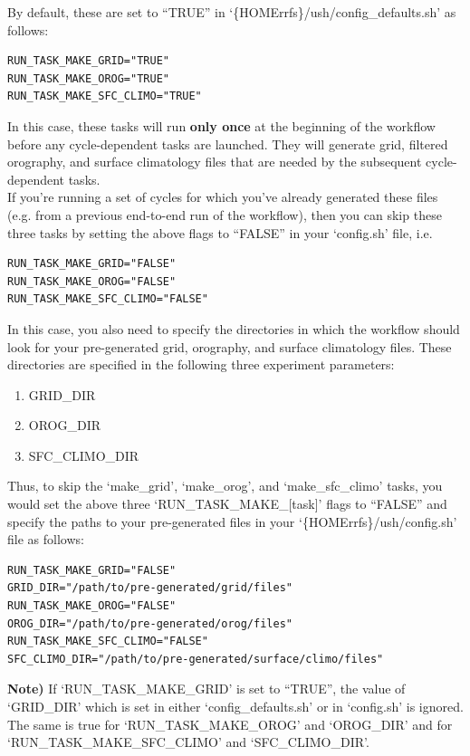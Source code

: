 \documentclass[11pt,fleqn]{report}              %
\begin{document}
By default, these are set to ``TRUE'' in `\{HOMErrfs\}/ush/config\_defaults.sh' as follows:
\lstset{language=bash}   
\begin{lstlisting}[frame=trBL]
RUN_TASK_MAKE_GRID="TRUE"
RUN_TASK_MAKE_OROG="TRUE"
RUN_TASK_MAKE_SFC_CLIMO="TRUE"
\end{lstlisting}

In this case, these tasks will run {\bf only once} at the beginning of the workflow before any cycle-dependent tasks are launched. They will generate grid, filtered orography, and surface climatology files that are needed by the subsequent cycle-dependent tasks.\\

If you’re running a set of cycles for which you’ve already generated these files (e.g. from a previous end-to-end run of the workflow), then you can skip these three tasks by setting the above flags to ``FALSE'' in your `config.sh' file, i.e.
\lstset{language=bash}   
\begin{lstlisting}[frame=trBL]
RUN_TASK_MAKE_GRID="FALSE"
RUN_TASK_MAKE_OROG="FALSE"
RUN_TASK_MAKE_SFC_CLIMO="FALSE"
\end{lstlisting}

In this case, you also need to specify the directories in which the workflow should look for your pre-generated grid, orography, and surface climatology files.  These directories are specified in the following three experiment parameters:
\begin{enumerate}
\item GRID\_DIR
\item OROG\_DIR
\item SFC\_CLIMO\_DIR
\end{enumerate}

Thus, to skip the `make\_grid', `make\_orog', and `make\_sfc\_climo' tasks, you would set the above three `RUN\_TASK\_MAKE\_[task]' flags to ``FALSE'' and specify the paths to your pre-generated files in your `\{HOMErrfs\}/ush/config.sh' file as follows:
\lstset{language=bash}   
\begin{lstlisting}[frame=trBL]
RUN_TASK_MAKE_GRID="FALSE"
GRID_DIR="/path/to/pre-generated/grid/files"
RUN_TASK_MAKE_OROG="FALSE"
OROG_DIR="/path/to/pre-generated/orog/files"
RUN_TASK_MAKE_SFC_CLIMO="FALSE"
SFC_CLIMO_DIR="/path/to/pre-generated/surface/climo/files"
\end{lstlisting}

{\bf Note)} If `RUN\_TASK\_MAKE\_GRID' is set to ``TRUE'', the value of `GRID\_DIR' which is set in either `config\_defaults.sh' or in `config.sh' is ignored. The same is true for `RUN\_TASK\_MAKE\_OROG' and `OROG\_DIR' and for `RUN\_TASK\_MAKE\_SFC\_CLIMO' and `SFC\_CLIMO\_DIR'.  \\
\end{document}
